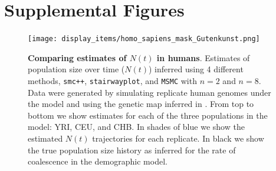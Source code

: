 \documentclass[12pt,halfline,a4paper]{ouparticle}
\newcommand{\beginsupplement}{%
        \setcounter{table}{0}
        \renewcommand{\thetable}{S\arabic{table}}%
        \setcounter{figure}{0}
        \renewcommand{\thefigure}{S\arabic{figure}}%
     }
\newcommand{\MSMC}{\texttt{MSMC}\xspace}
\newcommand{\smcpp}{\texttt{smc++}\xspace}
\newcommand{\stairwayplot}{\texttt{stairwayplot}\xspace}
\begin{document}






\pagebreak
\beginsupplement
\section*{Supplemental Figures}
\begin{figure}
\begin{center}
\texttt{[image: display\_items/homo\_sapiens\_mask\_Gutenkunst.png]}
\caption{\textbf{Comparing estimates of $N(t)$ in humans}. Estimates of population
size over time ($N(t)$) inferred using 4 different methods, \smcpp, \stairwayplot, and
\MSMC with $n=2$ and $n=8$. Data were generated by simulating
replicate human genomes under the \cite{gutenkunst2009inferring} model and using the genetic map
inferred in \cite{international2007second}. From top to bottom we show estimates for each
of the three populations in the model: YRI, CEU, and CHB. In shades of blue we show the estimated
$N(t)$ trajectories for each replicate. In black we show the true population size history as inferred
for the rate of coalescence in the demographic model.}
\label{fig:n_t_gutenkunst}
\end{center}
\end{figure}
\end{document}

